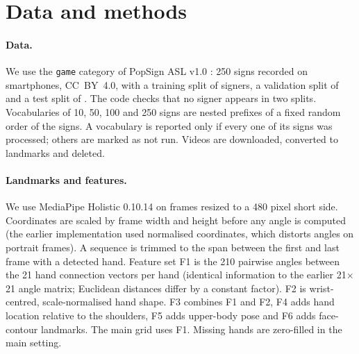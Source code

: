 \section{Data and methods}
\label{sec:methods}
\paragraph{Data.} We use the \texttt{game} category of PopSign ASL v1.0 \citep{starner2023popsign}: 250 signs recorded on
smartphones, CC~BY~4.0, with a training split of \nSignersTrain{} signers, a validation split of \nSignersVal{} and a test split of \nSignersTest{}. The code checks that
no signer appears in two splits. Vocabularies of 10, 50, 100 and 250 signs are nested prefixes of a fixed random order of the
signs. A vocabulary is reported only if every one of its signs was processed; others are marked as not run. Videos are
downloaded, converted to landmarks and deleted.

\paragraph{Landmarks and features.} We use MediaPipe Holistic 0.10.14 \citep{lugaresi2019mediapipe} on frames resized to a
480 pixel short side. Coordinates are scaled by frame width and height before any angle is computed (the earlier
implementation used normalised coordinates, which distorts angles on portrait frames). A sequence is trimmed to the span
between the first and last frame with a detected hand. Feature set F1 is the 210 pairwise angles between the 21 hand
connection vectors per hand (identical information to the earlier 21$\times$21 angle matrix; Euclidean distances differ by a
constant factor). F2 is wrist-centred, scale-normalised hand shape. F3 combines F1 and F2, F4 adds hand location relative
to the shoulders, F5 adds upper-body pose and F6 adds face-contour landmarks. The main grid uses F1. Missing hands are
zero-filled in the main setting.

